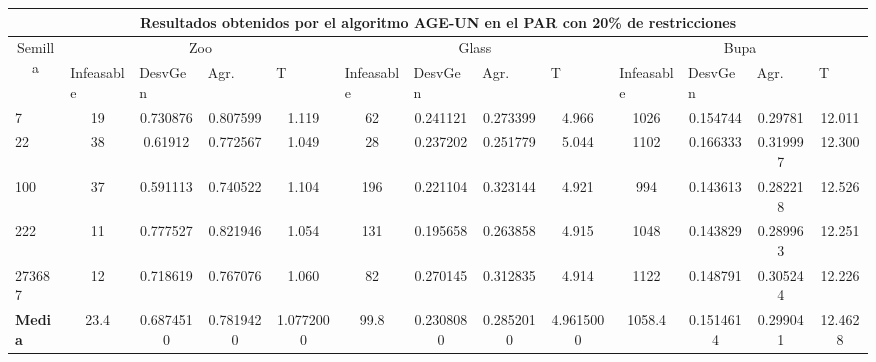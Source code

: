 \begin{table}[H]
	\tiny

	\begin{adjustwidth}{-1cm}{-1cm}%
	
	\begin{tabular}{|l|c|c|c|c|c|c|c|c|c|c|c|c|}
	\hline
	\multicolumn{13}{|c|}{\textbf{Resultados obtenidos por el algoritmo AGE-UN en el PAR con 20\% de restricciones}}                                                                                                                                                                                                                                                                                                                                            \\ \hline
	\multicolumn{1}{|c|}{\multirow{2}{*}{Semilla}} & \multicolumn{4}{c|}{Zoo}                                                                                          & \multicolumn{4}{c|}{Glass}                                                                                         & \multicolumn{4}{c|}{Bupa}                                                                                          \\ \cline{2-13} 
	\multicolumn{1}{|c|}{}                                  & \multicolumn{1}{l|}{Infeasable} & \multicolumn{1}{l|}{DesvGen} & \multicolumn{1}{l|}{Agr.} & \multicolumn{1}{l|}{T} & \multicolumn{1}{l|}{Infeasable} & \multicolumn{1}{l|}{DesvGen} & \multicolumn{1}{l|}{Agr.} & \multicolumn{1}{l|}{T} & \multicolumn{1}{l|}{Infeasable} & \multicolumn{1}{l|}{DesvGen} & \multicolumn{1}{l|}{Agr.} & \multicolumn{1}{l|}{T} \\ \hline
	7   	& 19 & 0.730876 & 0.807599 & 1.119 &  				62 & 0.241121 & 0.273399 & 4.966 &			 	1026 & 0.154744 & 0.29781 & 12.011 		\\ \hline
	22 		& 38 & 0.61912 & 0.772567 &	1.049 & 				28 & 0.237202 & 0.251779 & 5.044	&		 		1102 & 0.166333 & 0.319997 &	12.300		\\ \hline
	100 	& 37 & 0.591113 & 0.740522 &	1.104 & 			196 & 0.221104 & 0.323144 & 4.921 &				994 & 0.143613 & 0.282218 &	12.526		\\ \hline
	222 	& 11 & 0.777527 & 0.821946 & 1.054 &				131 & 0.195658 & 0.263858 & 4.915 &				1048 & 0.143829 & 0.289963 &	12.251		\\ \hline
	273687 	& 12 & 0.718619 & 0.767076 &	1.060 &				82 & 0.270145 & 0.312835 & 	4.914&				1122 & 0.148791 & 0.305244 &	12.226		\\ \hline
	\textbf{Media} &  23.4 & 	0.6874510 & 	0.7819420 & 	1.0772000 & 	99.8 & 	0.2308080 & 	0.2852010 & 	4.9615000	 & 1058.4 & 	0.1514614 & 	0.299041 & 	12.4628   \\ \hline
	\end{tabular}
	
	\end{adjustwidth}
	
\end{table}

